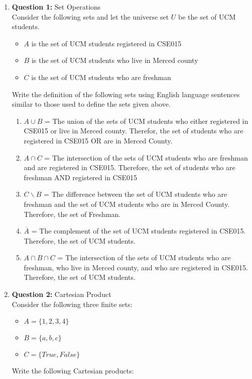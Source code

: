 \documentclass[11pt]{article}
\begin{document}
\begin{enumerate}
\item
\textbf{Question 1:} Set Operations \\
Consider the following sets and let the universe set $U$ be the set of UCM students. 
\begin{itemize}
    \item 
    $A$ is the set of UCM students registered in CSE015
    \item 
    $B$ is the set of UCM students who live in Merced county
    \item 
    $C$ is the set of UCM students who are freshman
\end{itemize}
Write the definition of the following sets using English language sentences similar to those used to define the sets given above. 
\begin{enumerate}[label=(\alph*)]
    \item
    $A \cup B$ = The union of the sets of UCM students who either registered in CSE015 or live in Merced county. Therefor, the set of students who are registered in CSE015 OR are in Merced County.
    \item 
    $A \cap C$ = The intersection of the sets of UCM students who are freshman and are registered in CSE015. Therefore, the set of students who are freshman AND registered in CSE015
    \item 
    $C \backslash B$ = The difference between the set of UCM students who are freshman and the set of UCM students who are in Merced County. Therefore, the set of Freshman.
    \item 
    $\overline{A}$ = The complement of the set of UCM students registered in CSE015. Therefore, the set of UCM students.
    \item 
    $A \cap B \cap C$ = The intersection of the sets of UCM students who are freshman, who live in Merced county, and who are registered in CSE015. Therefore, the set of UCM students. 
    \end{enumerate}
\item
\textbf{Question 2:} Cartesian Product \\
Consider the following three finite sets:
\begin{itemize}
    \item 
    $A = \{ 1,2,3,4\} $
    \item 
    $B = \{ a, b , c\} $
    \item 
   $C = \{ True, False\} $
\end{itemize}
Write the following Cartesian products: 
\begin{enumerate}[label=(\alph*)]

\end{enumerate}
\end{enumerate}
\end{document}
